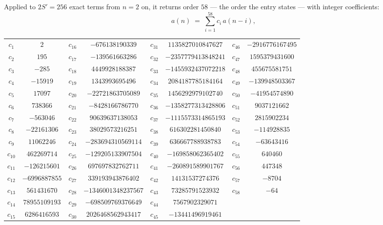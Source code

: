 \documentclass[11pt,a4paper]{article}
\theoremstyle{plain}
\theoremstyle{definition}
\begin{document}
Applied to $2S'=256$ exact terms from $n=2$ on, it returns order $58$ --- the
order the entry states --- with integer coefficients:
\[
a(n)\;=\;\sum_{i=1}^{58}c_i\,a(n-i),
\]
\begin{center}\small
\begin{tabular}{cccccccc}
$c_{1}$ & $2$ & $c_{16}$ & $-676138190339$ & $c_{31}$ & $1135827010847627$ & $c_{46}$ & $-2916776167495$ \\
$c_{2}$ & $195$ & $c_{17}$ & $-139561663286$ & $c_{32}$ & $-2357779413848241$ & $c_{47}$ & $1595379431600$ \\
$c_{3}$ & $-285$ & $c_{18}$ & $4449928188387$ & $c_{33}$ & $-1455932437072218$ & $c_{48}$ & $455675581751$ \\
$c_{4}$ & $-15919$ & $c_{19}$ & $1343993695496$ & $c_{34}$ & $2084187785184164$ & $c_{49}$ & $-139948503367$ \\
$c_{5}$ & $17097$ & $c_{20}$ & $-22721863705089$ & $c_{35}$ & $1456292979102740$ & $c_{50}$ & $-41954574890$ \\
$c_{6}$ & $738366$ & $c_{21}$ & $-8428166786770$ & $c_{36}$ & $-1358277313428806$ & $c_{51}$ & $9037121662$ \\
$c_{7}$ & $-563046$ & $c_{22}$ & $90639637138053$ & $c_{37}$ & $-1115573314865193$ & $c_{52}$ & $2815902234$ \\
$c_{8}$ & $-22161306$ & $c_{23}$ & $38029573216251$ & $c_{38}$ & $616302281450840$ & $c_{53}$ & $-114928835$ \\
$c_{9}$ & $11062246$ & $c_{24}$ & $-283694310569114$ & $c_{39}$ & $636667788938783$ & $c_{54}$ & $-63643416$ \\
$c_{10}$ & $462269714$ & $c_{25}$ & $-129205133907504$ & $c_{40}$ & $-169858062365402$ & $c_{55}$ & $640460$ \\
$c_{11}$ & $-126215601$ & $c_{26}$ & $697697832762711$ & $c_{41}$ & $-260891589901767$ & $c_{56}$ & $447348$ \\
$c_{12}$ & $-6996887855$ & $c_{27}$ & $339193943876402$ & $c_{42}$ & $14131537274376$ & $c_{57}$ & $-8704$ \\
$c_{13}$ & $561431670$ & $c_{28}$ & $-1346001348237567$ & $c_{43}$ & $73285791523932$ & $c_{58}$ & $-64$ \\
$c_{14}$ & $78955109193$ & $c_{29}$ & $-698509769376649$ & $c_{44}$ & $7567902329071$ &  &  \\
$c_{15}$ & $6286416593$ & $c_{30}$ & $2026468562943417$ & $c_{45}$ & $-13441496919461$ &  &  \\
\end{tabular}
\end{center}
\end{document}
